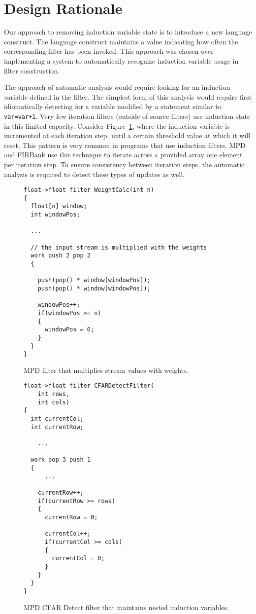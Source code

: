 \section{Design Rationale}

Our approach to removing induction variable state is to introduce a new language construct.  The language construct maintains a value indicating how often the corresponding filter has been invoked.  This approach was chosen over implementing a system to automatically recognize induction variable usage in filter construction.

The approach of automatic analysis would require looking for an induction variable defined in the filter.  The simplest form of this analysis would require first idiomatically detecting for a variable modified by a statement similar to \texttt{var=var+1}.  Very few iteration filters (outside of source filters) use induction state in this limited capacity.  Consider Figure~\ref{fig:weight-calc}, where the induction variable is incremented at each iteration step, until a certain threshold value at which it will reset.  This pattern is very common in programs that use induction filters.  MPD and FIRBank use this technique to iterate across a provided array one element per iteration step.  To ensure consistency between iteration steps, the automatic analysis is required to detect these types of updates as well.  

\begin{figure}[t]
{\eightpoint
\begin{verbatim}
float->float filter WeightCalc(int n)
{
  float[n] window;
  int windowPos;

  ...

  // the input stream is multiplied with the weights
  work push 2 pop 2
  {

    push(pop() * window[windowPos]);
    push(pop() * window[windowPos]);

    windowPos++;
    if(windowPos >= n)
    {
      windowPos = 0;
    }
  }
}
\end{verbatim}
\caption{MPD filter that multiplies stream values with weights.\protect\label{fig:weight-calc}}}
\end{figure}

\begin{figure}[t]
{\eightpoint
\begin{verbatim}
float->float filter CFARDetectFilter(
    int rows, 
    int cols)
{
  int currentCol;
  int currentRow;

    ...

  work pop 3 push 1
  {
      ...

    currentRow++;
    if(currentRow >= rows)
    {
      currentRow = 0;

      currentCol++;
      if(currentCol >= cols)
      {
        currentCol = 0;
      }
    }
  }
}
\end{verbatim}
\caption{MPD CFAR Detect filter that maintains nested induction variables.\protect\label{fig:cfar-detect-filter}}}
\end{figure}

